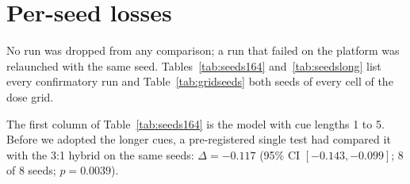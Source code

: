 \begin{table}[!htb]
\centering
\footnotesize
\setlength{\tabcolsep}{4pt}

\caption{Loss of the model with \ingram{} minus loss of the 3:1 hybrid, by token type, for
the three pairs of Table~\ref{tab:confirm} at 8 blocks of width 256 that train both arms equally long (seeds 20--27
averaged per token). The second column is the share of evaluation tokens. Brackets are 95\%
bootstrap intervals over the 32 evaluation windows (10,000 resamples). Exploratory; the claims are
in Section~\ref{sec:types}.}
\label{tab:types}
\end{table}

\begin{table}[!htb]
\centering
\footnotesize
\setlength{\tabcolsep}{4pt}

\caption{Cost of removing both attention layers, $C(P) = L(A{=}0, P) - L(A{=}2, P)$ in nats per
token, by token type and number of placements $P$ (Figure~\ref{fig:types} plots $P = 0$ and $P =
1$). The second column is the share of evaluation tokens of each type. Brackets are 95\% bootstrap
intervals over the 32 evaluation windows (10,000 resamples, windows resampled jointly for both
models, seeds 0 and 1 averaged). Exploratory; the claims are in Section~\ref{sec:types}.}
\label{tab:a3}
\end{table}

\begin{table}[!htb]
\centering
\small

\caption{Induction share of far attention on the dose grid, as defined in
Appendix~\ref{app:grid}, and the mean attention mass on keys more than 512 tokens back. Seeds 0
and 1; exploratory.}
\label{tab:a4}
\end{table}

\section{Per-seed losses}
\label{app:seeds}

No run was dropped from any comparison; a run that failed on the platform was relaunched with the
same seed. Tables~\ref{tab:seeds164} and~\ref{tab:seedslong} list every confirmatory run and
Table~\ref{tab:gridseeds} both seeds of every cell of the dose grid.

The first column of Table~\ref{tab:seeds164} is the model with cue lengths 1 to 5. Before we
adopted the longer cues, a pre-registered single test had compared it with the 3:1 hybrid on the
same seeds: $\Delta = -0.117$ (95\% CI $[-0.143, -0.099]$; 8 of 8 seeds; $p = 0.0039$).

